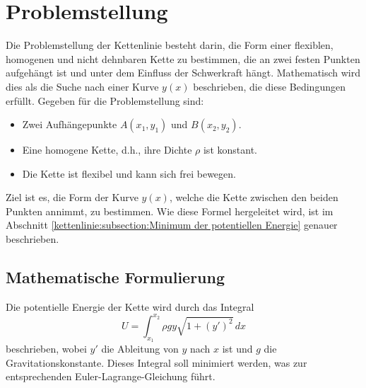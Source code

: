 %
%
%
%
\section{Problemstellung\label{kettenlinie:section:Problemstellung}}
Die Problemstellung der Kettenlinie besteht darin, die Form einer flexiblen, homogenen und nicht dehnbaren Kette zu bestimmen, die an zwei festen Punkten aufgehängt ist und unter dem Einfluss der Schwerkraft hängt.
Mathematisch wird dies als die Suche nach einer Kurve \( y(x) \) beschrieben, die diese Bedingungen erfüllt.
Gegeben für die Problemstellung sind: 
\begin{itemize}
\item
Zwei Aufhängepunkte \( A(x_1, y_1) \) und \( B(x_2, y_2) \).
\item
Eine homogene Kette, d.h., ihre Dichte \( \rho \) ist konstant.
\item
Die Kette ist flexibel und kann sich frei bewegen.
\end{itemize}
Ziel ist es, die Form der Kurve \( y(x) \), welche die Kette zwischen den beiden Punkten annimmt, zu bestimmen.
Wie diese Formel hergeleitet wird, ist im Abschnitt \ref{kettenlinie:subsection:Minimum der potentiellen Energie} genauer beschrieben.

\subsection{Mathematische Formulierung
\label{kettenlinie:subsection:Mathematische Formulierung}}
Die potentielle Energie der Kette wird durch das Integral
\begin{equation}
	U = \int_{x_1}^{x_2} \rho g y \sqrt{1 + (y')^2} \, dx
\end{equation}
beschrieben, wobei \( y' \) die Ableitung von \( y \) nach \( x \) ist und \( g \) die Gravitationskonstante.
Dieses Integral soll minimiert werden, was zur entsprechenden Euler-Lagrange-Gleichung führt.


